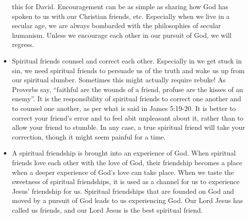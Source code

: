 \begin{itemize}
{  this for David.  Encouragement can be as simple as sharing how God has
  spoken to us with our Christian friends, etc.  Especially when we live in a
  secular age, we are always bombarded with the philosophies of secular
  humanism.  Unless we encourage each other in our pursuit of God, we will
  regress.}
  \item{Spiritual friends counsel and correct each other.  Especially in we
  get stuck in sin, we need spiritual friends to persuade us of the truth and
  wake us up from our spiritual slumber.  Sometimes this might actually
  require rebuke!  As Proverbs say, ``faithful are the wounds of a friend,
  profuse are the kisses of an enemy''.  It is the responsibility of
  spiritual friends to correct one another and to counsel one another, as per
  what is said in James 5:19-20.  It is better to correct your friend's error
  and to feel abit unpleasant about it, rather than to allow your friend to
  stumble.  In any case, a true spiritual friend will take your correction,
  though it might seem painful for a time.}
  \item{A spiritual friendship is brought into an experience of God.  When
  spiritual friends love each other with the love of God, their friendship
  becomes a place when a deeper experience of God's love can take place.
  When we taste the sweetness of spiritual friendships, it is used as a
  channel for us to experience Jesus' friendship for us.  Spiritual
  friendships that are founded on God and moved by a pursuit of God leads to
  us experiencing God.  Our Lord Jesus has called us friends, and our Lord
  Jesus is the best spiritual friend.}
\end{itemize}